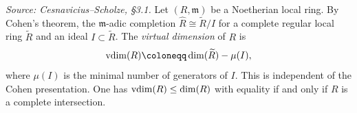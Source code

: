 \begin{definition}
  \label{def:virtual_dim}
  \textit{Source: Cesnavicius--Scholze, §3.1.}
  Let \((R, \mathfrak{m})\) be a Noetherian local ring. By Cohen's theorem, the \(\mathfrak{m}\)-adic completion \(\widehat{R} \cong \widetilde{R}/I\) for a complete regular local ring \(\widetilde{R}\) and an ideal \(I \subset \widetilde{R}\). The \emph{virtual dimension} of \(R\) is
  \[
    \vdim(R) \coloneqq \dim(\widetilde{R}) - \mu(I),
  \]
  where \(\mu(I)\) is the minimal number of generators of \(I\). This is independent of the Cohen presentation. One has \(\operatorname{vdim}(R) \le \dim(R)\) with equality if and only if \(R\) is a complete intersection.
\end{definition}

